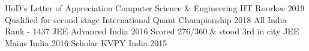 

\begin{cvhonors}
  \cvhonor
    { HoD's Letter of Appreciation} %
    {Computer Science \& Engineering} %
    {IIT Roorkee} %
    {2019} %
    \cvhonor
    {Qualified for second stage} %
    {International Quant Championship} %
    {} %
    {2018} %
    \cvhonor
    {All India Rank - 1437}
    {JEE Advanced}
    {India}
    {2016}
  \cvhonor
    {Scored 276/360 \& stood 3rd in city} %
    {JEE Mains} %
    {India} %
    {2016} %
  \cvhonor
    {Scholar} %
    {KVPY} %
    {India} %
    {2015} %
  
\end{cvhonors}

